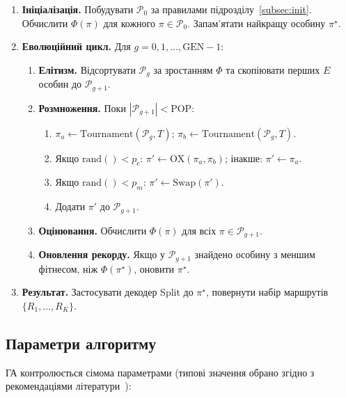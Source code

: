 \documentclass[14pt,a4paper]{extarticle}
\theoremstyle{definition}
\theoremstyle{plain}
\begin{document}
\begin{enumerate}[leftmargin=2em, label=\textbf{Крок \arabic*.}]
    \item \textbf{Ініціалізація.} Побудувати $\mathcal{P}_0$ за правилами підрозділу~\ref{subsec:init}. Обчислити $\Phi(\pi)$ для кожного $\pi \in \mathcal{P}_0$. Запам'ятати найкращу особину $\pi^\star$.

    \item \textbf{Еволюційний цикл.} Для $g = 0, 1, \ldots, \mathrm{GEN}-1$:
    \begin{enumerate}[label=(\alph*), leftmargin=2em]
        \item \textbf{Елітизм.} Відсортувати $\mathcal{P}_g$ за зростанням $\Phi$ та скопіювати перших $E$ особин до $\mathcal{P}_{g+1}$.
        \item \textbf{Розмноження.} Поки $|\mathcal{P}_{g+1}| < \mathrm{POP}$:
        \begin{enumerate}[label=\roman*.]
            \item $\pi_a \leftarrow \mathrm{Tournament}(\mathcal{P}_g, T)$; \; $\pi_b \leftarrow \mathrm{Tournament}(\mathcal{P}_g, T)$.
            \item Якщо $\mathrm{rand}() < p_c$: $\pi' \leftarrow \mathrm{OX}(\pi_a, \pi_b)$;
                \quad інакше: $\pi' \leftarrow \pi_a$.
            \item Якщо $\mathrm{rand}() < p_m$: $\pi' \leftarrow \mathrm{Swap}(\pi')$.
            \item Додати $\pi'$ до $\mathcal{P}_{g+1}$.
        \end{enumerate}
        \item \textbf{Оцінювання.} Обчислити $\Phi(\pi)$ для всіх $\pi \in \mathcal{P}_{g+1}$.
        \item \textbf{Оновлення рекорду.} Якщо у $\mathcal{P}_{g+1}$ знайдено особину з меншим фітнесом, ніж $\Phi(\pi^\star)$, оновити $\pi^\star$.
    \end{enumerate}

    \item \textbf{Результат.} Застосувати декодер Split до $\pi^\star$, повернути набір маршрутів $\{R_1, \ldots, R_K\}$.
\end{enumerate}

\subsection{Параметри алгоритму}

ГА контролюється сімома параметрами (типові значення обрано згідно з рекомендаціями літератури~\cite{prins2004, goldberg1989}):
\end{document}
